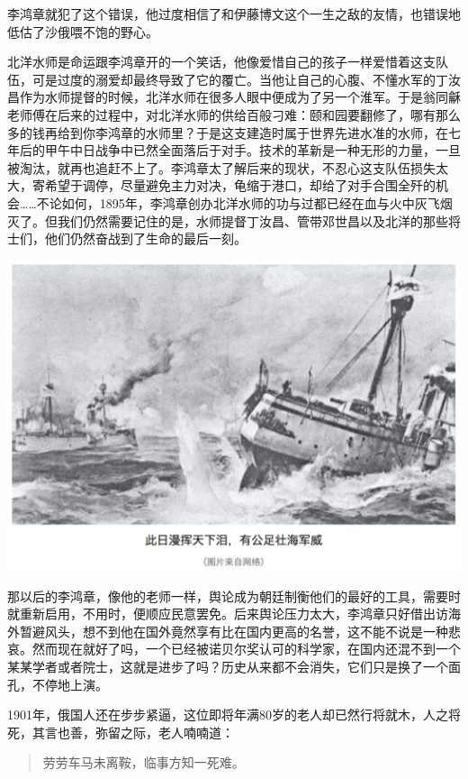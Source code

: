 \documentclass[
]{book}
\begin{document}
李鸿章就犯了这个错误，他过度相信了和伊藤博文这个一生之敌的友情，也错误地低估了沙俄喂不饱的野心。

北洋水师是命运跟李鸿章开的一个笑话，他像爱惜自己的孩子一样爱惜着这支队伍，可是过度的溺爱却最终导致了它的覆亡。当他让自己的心腹、不懂水军的丁汝昌作为水师提督的时候，北洋水师在很多人眼中便成为了另一个淮军。于是翁同龢老师傅在后来的过程中，对北洋水师的供给百般刁难：颐和园要翻修了，哪有那么多的钱再给到你李鸿章的水师里？于是这支建造时属于世界先进水准的水师，在七年后的甲午中日战争中已然全面落后于对手。技术的革新是一种无形的力量，一旦被淘汰，就再也追赶不上了。李鸿章太了解后来的现状，不忍心这支队伍损失太大，寄希望于调停，尽量避免主力对决，龟缩于港口，却给了对手合围全歼的机会\ldots\ldots 不论如何，1895年，李鸿章创办北洋水师的功与过都已经在血与火中灰飞烟灭了。但我们仍然需要记住的是，水师提督丁汝昌、管带邓世昌以及北洋的那些将士们，他们仍然奋战到了生命的最后一刻。

\includegraphics[width=6.67in]{images/his4}

那以后的李鸿章，像他的老师一样，舆论成为朝廷制衡他们的最好的工具，需要时就重新启用，不用时，便顺应民意罢免。后来舆论压力太大，李鸿章只好借出访海外暂避风头，想不到他在国外竟然享有比在国内更高的名誉，这不能不说是一种悲哀。然而现在就好了吗，一个已经被诺贝尔奖认可的科学家，在国内还混不到一个某某学者或者院士，这就是进步了吗？历史从来都不会消失，它们只是换了一个面孔，不停地上演。

1901年，俄国人还在步步紧逼，这位即将年满80岁的老人却已然行将就木，人之将死，其言也善，弥留之际，老人喃喃道：

\begin{quote}
劳劳车马未离鞍，临事方知一死难。
\end{quote}
\end{document}
